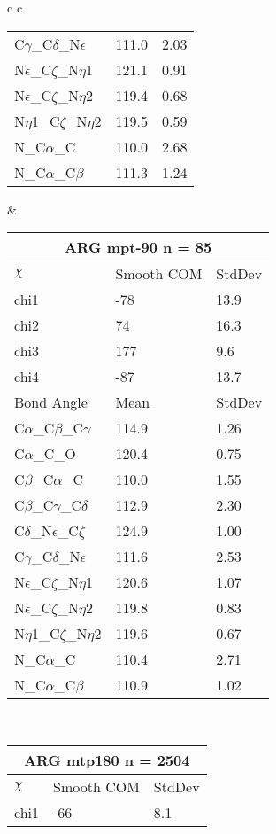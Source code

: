 \begin{longtable}{ c c }
\begin{tabular}{ l l l }
  C$\gamma$\_C$\delta$\_N$\epsilon$ & 111.0 & 2.03\\
  N$\epsilon$\_C$\zeta$\_N$\eta$1 & 121.1 & 0.91\\
  N$\epsilon$\_C$\zeta$\_N$\eta$2 & 119.4 & 0.68\\
  N$\eta$1\_C$\zeta$\_N$\eta$2 & 119.5 & 0.59\\
  N\_C$\alpha$\_C & 110.0 & 2.68\\
  N\_C$\alpha$\_C$\beta$ & 111.3 & 1.24\\
  \bottomrule
  \end{tabular}
  &
  \begin{tabular}{ l l l }
  \toprule
  \multicolumn{3}{c}{ARG \textbf{mpt-90} n = 85} \\ \toprule
  $\chi$       & Smooth COM & StdDev \\ \midrule
  chi1 & -78 & 13.9 \\ 
  chi2 & 74 & 16.3 \\ 
  chi3 & 177 & 9.6 \\ 
  chi4 & -87 & 13.7 \\ \midrule
  Bond Angle   & Mean     & StdDev \\ \midrule
  C$\alpha$\_C$\beta$\_C$\gamma$ & 114.9 & 1.26\\
  C$\alpha$\_C\_O & 120.4 & 0.75\\
  C$\beta$\_C$\alpha$\_C & 110.0 & 1.55\\
  C$\beta$\_C$\gamma$\_C$\delta$ & 112.9 & 2.30\\
  C$\delta$\_N$\epsilon$\_C$\zeta$ & 124.9 & 1.00\\
  C$\gamma$\_C$\delta$\_N$\epsilon$ & 111.6 & 2.53\\
  N$\epsilon$\_C$\zeta$\_N$\eta$1 & 120.6 & 1.07\\
  N$\epsilon$\_C$\zeta$\_N$\eta$2 & 119.8 & 0.83\\
  N$\eta$1\_C$\zeta$\_N$\eta$2 & 119.6 & 0.67\\
  N\_C$\alpha$\_C & 110.4 & 2.71\\
  N\_C$\alpha$\_C$\beta$ & 110.9 & 1.02\\
  \bottomrule
  \end{tabular}
  \\
  \begin{tabular}{ l l l }
  \toprule
  \multicolumn{3}{c}{ARG \textbf{mtp180} n = 2504} \\ \toprule
  $\chi$       & Smooth COM & StdDev \\ \midrule
  chi1 & -66 & 8.1 \\ 

\end{tabular}
\end{longtable}
